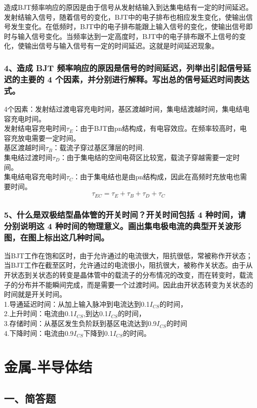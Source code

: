 \documentclass[cn,11pt]{elegantbook}
\begin{document}
造成BJT频率响应的原因是由于信号从发射结输入到达集电结有一定的时间延迟。发射结输入信号，随着信号的变化，BJT中的电子排布也相应发生变化，使输出信号发生变化。在低频时，BJT中的电子排布能跟上输入信号的变化，使输出信号即时与输入信号变化。当频率达到一定高度时，BJT中的电子排布跟不上信号的变化，使输出信号与输入信号有一定的时间延迟。这就是时间延迟现象。
\subsubsection*{4、造成 BJT 频率响应的原因是信号的时间延迟，列举出引起信号延迟的主要的 4 个因素，并分别进行解释。写出总的信号延迟时间表达式。}

4个因素：发射结过渡电容充电时间，基区渡越时间，集电结渡越时间，集电结电容充电时间。\\
发射结电容充电时间$\tau_{E}$：由于BJT由pn结构成，有电容效应。在频率较高时，电容充放电需要一定时间。\\基区渡越时间$\tau_{B}$：载流子穿过基区薄层的时间.\\集电结过渡时间$\tau_{D}$：由于集电结的空间电荷区比较宽，载流子穿越需要一定时间。\\集电结电容充电时间$\tau_{C}$：由于集电结也是由pn结构成，因此在高频时充放电也需要时间。
$$\tau_{EC}=\tau_{E}+\tau_{B}+\tau_{D}+\tau_{C}$$
\subsubsection*{5、什么是双极结型晶体管的开关时间？开关时间包括 4 种时间，请分别说明这 4 种时间的物理意义。画出集电极电流的典型开关波形图，在图上标出这几种时间。}

当BJT工作在饱和区时，由于允许通过的电流很大，阻抗很低，常被称作开状态；当BJT工作在截至区时，允许通过的电流很小，阻抗很大，被称作关状态。由于从开状态到关状态的转变是晶体管中的载流子的分布情况的改变，而在转变时，载流子的分布并不能瞬间完成，而是需要一个过渡时间。因此由开状态转变为关状态的时间就是开关时间。\\
1.导通延迟时间：从加上输入脉冲到电流达到0.1$I_{CS}$的时间，\\2.上升时间：电流由0.1$I_{CS}$,到达0.1$I_{CS}$的时间，\\3.存储时间：从基区发生负阶跃到基区电流达到0.9$I_{CS}$的时间\\4.下降时间：电流由0.9$I_{CS}$下降到0.1$I_{CS}$的时间。
\section{金属-半导体结}
\subsection*{一、简答题}
\end{document}
